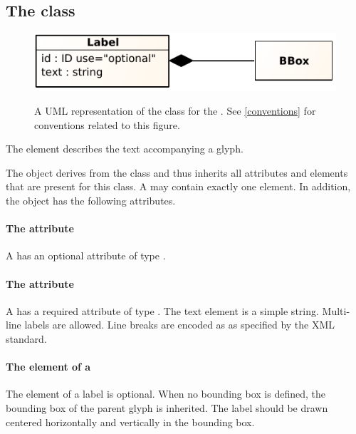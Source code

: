 \subsection{The  class}
\label{label-class}

\begin{figure}[ht!]
  \centering
  \includegraphics[scale=1.0]{figures/sbgnml_label_uml.pdf}\\
\caption{A UML representation of the \Label class for the
\SbgnmlPackage. See \ref{conventions} for conventions related to this
figure. }
  \label{fig:sbgnml_label_uml}
\end{figure}


The \Label element describes the text accompanying a glyph.

The \Label object derives from the \SbgnBase class and thus inherits all
attributes and elements that are present for this class.
A \Label may contain exactly one \BBox element.
In addition, the \Label object has the following attributes.

\paragraph{The \fixttspace{} attribute}

A \Label has an optional attribute  of type .


\paragraph{The \fixttspace{} attribute}

A \Label has a required attribute  of type
. The text element is a simple string. Multi-line labels are allowed. Line breaks are encoded as  as specified by the XML standard.

\paragraph{The \BBox element of a \Label}

The  element of a label is optional. When no bounding box is defined, the bounding box of the parent glyph is inherited. The label should be drawn centered horizontally and vertically in the bounding box.

